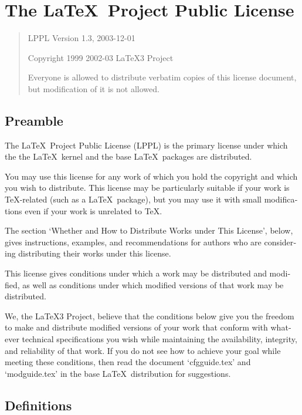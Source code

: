\chapter{The \LaTeX\ Project Public License}
\begin{otherlanguage}{english}
\begin{quote}
LPPL Version 1.3,  2003-12-01

Copyright 1999 2002-03 \LaTeX3 Project

    Everyone is allowed to distribute verbatim copies of this
    license document, but modification of it is not allowed.
\end{quote}

\section{Preamble}

The \LaTeX\ Project Public License (LPPL) is the primary license under
which the the \LaTeX\ kernel and the base \LaTeX\ packages are
distributed.

You may use this license for any work of which you hold the copyright
and which you wish to distribute.  This license may be particularly
suitable if your work is \TeX-related (such as a \LaTeX\ package), but
you may use it with small modifications even if your work is unrelated
to \TeX.

The section `Whether and How to Distribute Works under This License',
below, gives instructions, examples, and recommendations for authors
who are considering distributing their works under this license.

This license gives conditions under which a work may be distributed
and modified, as well as conditions under which modified versions of
that work may be distributed.

We, the \LaTeX3 Project, believe that the conditions below give you the
freedom to make and distribute modified versions of your work that
conform with whatever technical specifications you wish while
maintaining the availability, integrity, and reliability of that work.
If you do not see how to achieve your goal while meeting these
conditions, then read the document `cfgguide.tex' and `modguide.tex' in
the base \LaTeX\ distribution for suggestions.


\section{Definitions}


\end{otherlanguage}
